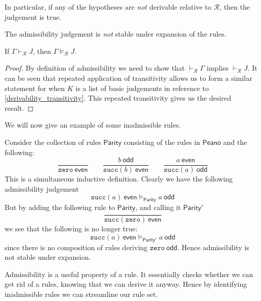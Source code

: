 \begin{remark}
    In particular, if any of the hypotheses are \emph{not} derivable relative to $\mathcal{R}$, then the judgement is  true.
\end{remark}


The admissibility judgement is \emph{not} stable under expansion of the rules.

\begin{lemma}
    If $\Gamma \vdash_{\mathcal{R}} J$, then $\Gamma \vDash_{\mathcal{R}} J$.
\end{lemma}

\begin{proof}
    By definition of admissibility we need to show that $\vdash_{\mathcal{R}} \Gamma$ implies $\vdash_{\mathcal{R}} J$. It can be seen that repeated application of transitivity allows us to form a similar statement for when $K$ is a list of basic judgements in reference to \ref{derivability_transitivity}. This repeated transitivity gives us the desired result.
\end{proof}

We will now give an example of some inadmissible rules.

\begin{example}
    Consider the collection of rules $\mathsf{Parity}$ consisting of the rules in $\mathsf{Peano}$ and the following:
    $$
        \frac{}{\texttt{zero}\ \mathsf{even}} \qquad
        \frac{b\ \mathsf{odd}}{\texttt{succ}(b)\ \mathsf{even}} \qquad
        \frac{a\ \mathsf{even}}{\texttt{succ}(a)\ \mathsf{odd}}
    $$
    This is a simultaneous inductive definition. Clearly we have the following admissibility judgement
    $$ \texttt{succ}(a)\ \mathsf{even} \vDash_{\mathsf{Parity}} a\ \mathsf{odd} $$
    But by adding the following rule to $\mathsf{Parity}$, and calling it $\mathsf{Parity}'$
    $$
        \frac{}{\texttt{succ}(\texttt{zero}) \ \mathsf{even}}
    $$
    we see that the following is no longer true:
    $$ \texttt{succ}(a)\ \mathsf{even} \vDash_{\mathsf{Parity'}} a\ \mathsf{odd} $$
    since there is no composition of rules deriving $\texttt{zero}\ \mathsf{odd}$.
    Hence admissibility is not stable under expansion.
\end{example}

\begin{remark}
    Admissibility is a useful property of a rule. It essentially checks whether we can get rid of a rules, knowing that we can derive it anyway. Hence by identifying inadmissible rules we can streamline our rule set.
\end{remark}

